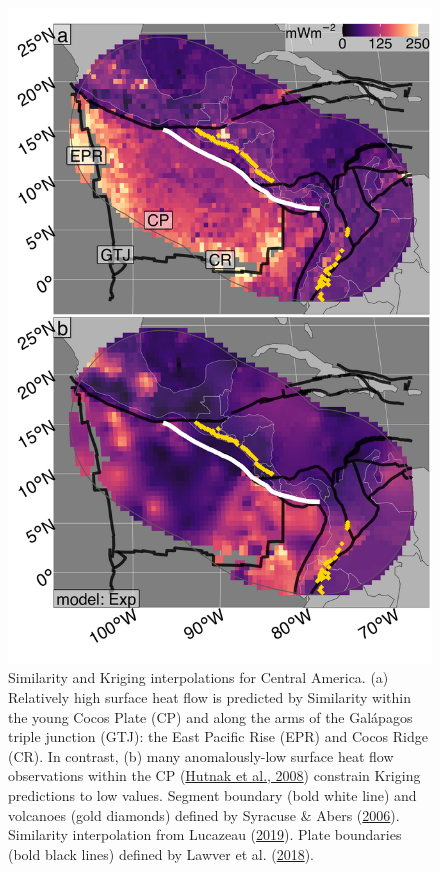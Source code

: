 \begin{figure}[htbp]

{\centering \includegraphics[width=1\linewidth,]{assets/figs/chpt3/CentralAmericaDiffComp} 

}

\caption[Similarity and Kriging interpolations for Central America]{Similarity and Kriging interpolations for Central America. (a) Relatively high surface heat flow is predicted by Similarity within the young Cocos Plate (CP) and along the arms of the Galápagos triple junction (GTJ): the East Pacific Rise (EPR) and Cocos Ridge (CR). In contrast, (b) many anomalously-low surface heat flow observations within the CP (\protect\hyperlink{ref-hutnak2008}{Hutnak et al., 2008}) constrain Kriging predictions to low values. Segment boundary (bold white line) and volcanoes (gold diamonds) defined by Syracuse \& Abers (\protect\hyperlink{ref-syracuse2006}{2006}). Similarity interpolation from Lucazeau (\protect\hyperlink{ref-lucazeau2019}{2019}). Plate boundaries (bold black lines) defined by Lawver et al. (\protect\hyperlink{ref-lawver2018}{2018}).}\label{fig:centralAmericaDiff}
\end{figure}

